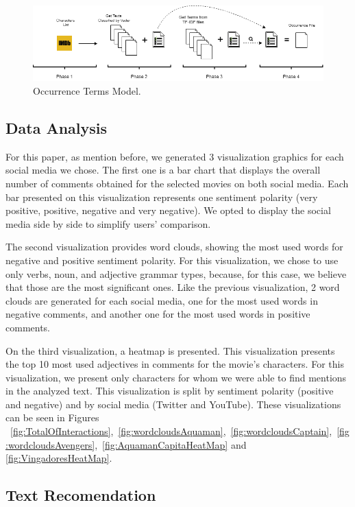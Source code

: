 \begin{figure}[btp]
\begin{center}
\includegraphics[width=0.8\linewidth]{img/diagrama-ocorrencia-movie.png}
\end{center}
   \caption{Occurrence Terms Model.}
\label{fig:phases}
\end{figure}

\subsection{Data Analysis}
\label{sec:DataAnalysis}

For this paper, as mention before, we generated 3 visualization graphics for each social media we chose. The first one is a bar chart that displays the overall number of comments obtained for the selected movies on both social media. Each bar presented on this visualization represents one sentiment polarity (very positive, positive, negative and very negative). We opted to display the social media side by side to simplify users' comparison. 

The second visualization provides word clouds, showing the most used words for negative and positive sentiment polarity. For this visualization, we chose to use only verbs, noun, and adjective grammar types, because, for this case, we believe that those are the most significant ones. Like the previous visualization, 2 word clouds are generated for each social media, one for the most used words in negative comments, and another one for the most used words in positive comments. 

On the third visualization, a heatmap is presented. This visualization presents the top 10 most used adjectives in comments for the movie's characters. For this visualization, we present only characters for whom we were able to find mentions in the analyzed text. This visualization is split by sentiment polarity (positive and negative) and by social media (Twitter and YouTube). These visualizations can be seen in Figures ~\ref{fig:TotalOfInteractions},~\ref{fig:wordcloudsAquaman},~\ref{fig:wordcloudsCaptain},~\ref{fig:wordcloudsAvengers},~\ref{fig:AquamanCapitaHeatMap} and \ref{fig:VingadoresHeatMap}.

\subsection{Text Recomendation}
\label{sec:TextualRecomendation}


